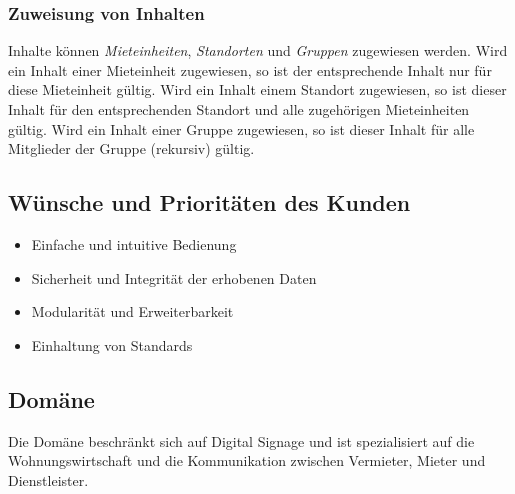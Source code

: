 \documentclass[a4paper]{article}
\begin{document}
	\subsubsection{Zuweisung von Inhalten}
	Inhalte können \emph{Mieteinheiten}, \emph{Standorten} und \emph{Gruppen} zugewiesen werden.
	Wird ein Inhalt einer Mieteinheit zugewiesen, so ist der entsprechende Inhalt nur für diese Mieteinheit gültig. Wird ein Inhalt einem Standort zugewiesen, so ist dieser Inhalt für den entsprechenden Standort und alle zugehörigen Mieteinheiten gültig. Wird ein Inhalt einer Gruppe zugewiesen, so ist dieser Inhalt für alle Mitglieder der Gruppe (rekursiv) gültig.
	\subsection{Wünsche und Prioritäten des Kunden}
	\begin{itemize}
		\item Einfache und intuitive Bedienung
		\item Sicherheit und Integrität der erhobenen Daten
		\item Modularität und Erweiterbarkeit
		\item Einhaltung von Standards
	\end{itemize}
		
	\subsection{Domäne}
	Die Domäne beschränkt sich auf Digital Signage und ist spezialisiert auf die Wohnungswirtschaft und die Kommunikation zwischen Vermieter, Mieter und Dienstleister.
\end{document}
